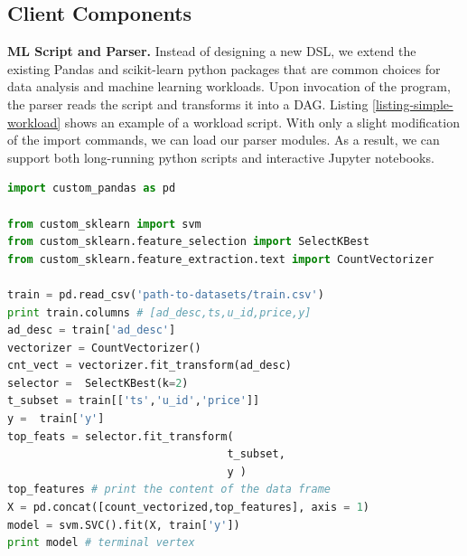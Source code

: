 \subsection{Client Components}
\textbf{ML Script and Parser.}
Instead of designing a new DSL, we extend the existing Pandas and scikit-learn \cite{sklearn_api} python packages that are common choices for data analysis and machine learning workloads.
Upon invocation of the program, the parser reads the script and transforms it into a DAG.
Listing \ref{listing-simple-workload} shows an example of a workload script.
With only a slight modification of the import commands, we can load our parser modules.
As a result, we can support both long-running python scripts and interactive Jupyter notebooks.
\begin{lstlisting}[language=Python, caption=Example script,captionpos=b,label = {listing-simple-workload}]
import custom_pandas as pd

from custom_sklearn import svm
from custom_sklearn.feature_selection import SelectKBest
from custom_sklearn.feature_extraction.text import CountVectorizer

train = pd.read_csv('path-to-datasets/train.csv') 
print train.columns # [ad_desc,ts,u_id,price,y]
ad_desc = train['ad_desc']
vectorizer = CountVectorizer()
cnt_vect = vectorizer.fit_transform(ad_desc)
selector =  SelectKBest(k=2)
t_subset = train[['ts','u_id','price']]
y =  train['y']
top_feats = selector.fit_transform(
                                  t_subset,  
                                  y )
top_features # print the content of the data frame		     
X = pd.concat([count_vectorized,top_features], axis = 1)
model = svm.SVC().fit(X, train['y'])
print model # terminal vertex
\end{lstlisting}


